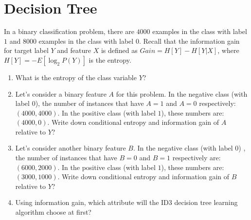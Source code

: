 \section{Decision Tree }
In a binary classification problem, there are $4000$ examples in the  class with label $1$ and $8000$ examples in the class with label $0$.     
Recall that the information gain for target label $Y$ and feature $X$ is defined as $Gain = H [Y] - H [Y |X ]$, where $H [Y ] = - E[\log_2 P (Y )]$ is the entropy.


\begin{enumerate}
\item{}  What is the entropy of the class variable $Y$?

\solution{}

\item {} Let's consider a binary feature $A$ for this problem. In the negative class (with label $0$), the number of instances that have $A=1$ and $A=0$ respectively: $(4000,4000)$. In the positive class (with label $1$), these numbers are: $(4000, 0)$. Write down conditional entropy and information gain of $A$ relative to $Y$?\\

\solution{}
\item{} 
Let's consider another binary feature $B$. In the negative class (with label $0$) , the number of instances that have $B=0$ and $B=1$ respectively are: $(6000,2000)$. In the positive class (with label $1$), these numbers are: $(3000,1000)$. Write down conditional entropy and information gain of $B$ relative to $Y$?\\
\solution{}

\item{} 
Using information gain, which attribute will the ID3 decision tree learning algorithm choose at first?

\solution{}

\end{enumerate}

